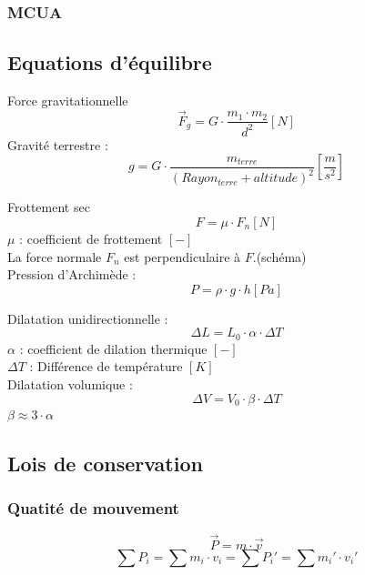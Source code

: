 \subsubsection{MCUA}


\subsection{Equations d'équilibre}
Force gravitationnelle
\begin{equation}
\vec{F}_g=G\cdot \frac{m_1 \cdot m_2}{d^2} [N]
\end{equation}
Gravité terrestre : 
\begin{equation}
g=G\cdot \frac{m_{terre}}{(Rayon_{terre}+altitude)^2}[\frac{m}{s^2}]
\end{equation}

Frottement sec
\begin{equation}
F=\mu \cdot F_n [N]
\end{equation}
$\mu$ : coefficient de frottement $[-]$\\
La force normale $F_n$ est perpendiculaire à $F$.(schéma)\\


Pression d'Archimède :
\begin{equation}
P=\rho \cdot g \cdot h [Pa]
\end{equation}

Dilatation unidirectionnelle :
\begin{equation}
\Delta L=L_0 \cdot \alpha  \cdot \Delta T
\end{equation}
$\alpha$ : coefficient de dilation thermique $[-]$\\
$\Delta T$ : Différence de température $[K]$\\

Dilatation volumique : 
\begin{equation}
\Delta V=V_0 \cdot \beta \cdot \Delta T
\end{equation}
$\beta \approx 3\cdot \alpha$

\subsection{Lois de conservation}
\subsubsection{Quatité de mouvement}
\begin{equation}
\vec{P}=m \cdot \vec{v}
\end{equation}
\begin{equation}
\sum P_{i}=\sum m_i \cdot v_i= \sum P_i '=\sum m_i ' \cdot v_i '
\end{equation}
